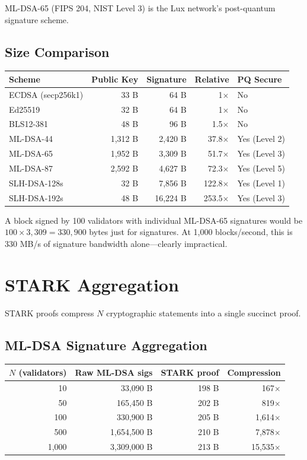 \documentclass[11pt,a4paper]{article}
\begin{document}
ML-DSA-65 (FIPS 204, NIST Level 3) is the Lux network's post-quantum signature scheme.

\subsection{Size Comparison}

\begin{center}
\begin{tabular}{lrrrl}
\toprule
\textbf{Scheme} & \textbf{Public Key} & \textbf{Signature} & \textbf{Relative} & \textbf{PQ Secure} \\
\midrule
ECDSA (secp256k1) & 33 B & 64 B & 1$\times$ & No \\
Ed25519 & 32 B & 64 B & 1$\times$ & No \\
BLS12-381 & 48 B & 96 B & 1.5$\times$ & No \\
ML-DSA-44 & 1,312 B & 2,420 B & 37.8$\times$ & Yes (Level 2) \\
ML-DSA-65 & 1,952 B & 3,309 B & 51.7$\times$ & Yes (Level 3) \\
ML-DSA-87 & 2,592 B & 4,627 B & 72.3$\times$ & Yes (Level 5) \\
SLH-DSA-128s & 32 B & 7,856 B & 122.8$\times$ & Yes (Level 1) \\
SLH-DSA-192s & 48 B & 16,224 B & 253.5$\times$ & Yes (Level 3) \\
\bottomrule
\end{tabular}
\end{center}

A block signed by 100 validators with individual ML-DSA-65 signatures would be $100 \times 3{,}309 = 330{,}900$ bytes just for signatures. At 1,000 blocks/second, this is 330 MB/s of signature bandwidth alone---clearly impractical.

\section{STARK Aggregation}

STARK proofs compress $N$ cryptographic statements into a single succinct proof.

\subsection{ML-DSA Signature Aggregation}

\begin{center}
\begin{tabular}{rrrr}
\toprule
\textbf{$N$ (validators)} & \textbf{Raw ML-DSA sigs} & \textbf{STARK proof} & \textbf{Compression} \\
\midrule
10 & 33,090 B & 198 B & 167$\times$ \\
50 & 165,450 B & 202 B & 819$\times$ \\
100 & 330,900 B & 205 B & 1,614$\times$ \\
500 & 1,654,500 B & 210 B & 7,878$\times$ \\
1,000 & 3,309,000 B & 213 B & 15,535$\times$ \\
\bottomrule
\end{tabular}
\end{center}
\end{document}

